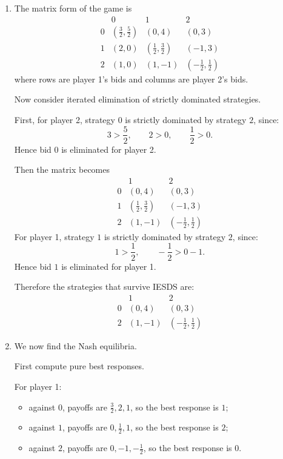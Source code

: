 \documentclass[12pt,a4paper]{article}
\begin{document}
\begin{enumerate}[label=\alph*.]
  \item The matrix form of the game is
  \[
  \begin{array}{c|ccc}
   & 0 & 1 & 2\\
  \hline
  0 & \left(\frac32,\frac52\right) & (0,4) & (0,3)\\
  1 & (2,0) & \left(\frac12,\frac32\right) & (-1,3)\\
  2 & (1,0) & (1,-1) & \left(-\frac12,\frac12\right)
  \end{array}
  \]
  where rows are player 1's bids and columns are player 2's bids.

  Now consider iterated elimination of strictly dominated strategies.

  First, for player 2, strategy \(0\) is strictly dominated by strategy \(2\), since:
  \[
  3>\frac52,\qquad 2>0,\qquad \frac12>0.
  \]
  Hence bid \(0\) is eliminated for player 2.

  Then the matrix becomes
  \[
  \begin{array}{c|cc}
   & 1 & 2\\
  \hline
  0 & (0,4) & (0,3)\\
  1 & \left(\frac12,\frac32\right) & (-1,3)\\
  2 & (1,-1) & \left(-\frac12,\frac12\right)
  \end{array}
  \]
  For player 1, strategy \(1\) is strictly dominated by strategy \(2\), since:
  \[
  1>\frac12,\qquad -\frac12>0-1.
  \]
  Hence bid \(1\) is eliminated for player 1.

  Therefore the strategies that survive IESDS are:
  \[
  \begin{array}{c|cc}
   & 1 & 2\\
  \hline
  0 & (0,4) & (0,3)\\
  2 & (1,-1) & \left(-\frac12,\frac12\right)
  \end{array}
  \]

  \item We now find the Nash equilibria.

  First compute pure best responses.

  For player 1:
  \begin{itemize}
    \item against \(0\), payoffs are \(\frac32,2,1\), so the best response is \(1\);
    \item against \(1\), payoffs are \(0,\frac12,1\), so the best response is \(2\);
    \item against \(2\), payoffs are \(0,-1,-\frac12\), so the best response is \(0\).
  \end{itemize}


\end{enumerate}
\end{document}
